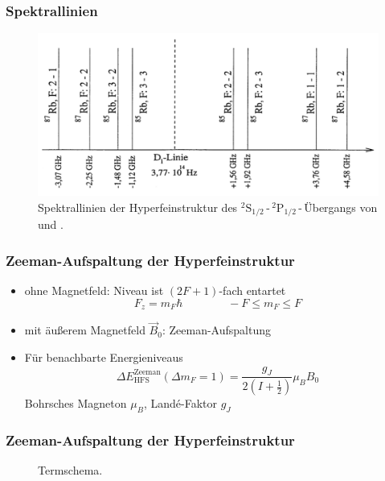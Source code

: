 \begin{frame}
\frametitle{Spektrallinien}
\begin{figure}
    \centering
    \includegraphics[width=\textwidth]{../img/HFSspect_theo.png}
    \caption{Spektrallinien der Hyperfeinstruktur des ${}^2\text{S}_{1/2}$\,-\,${}^2\text{P}_{1/2}$\,-\,Übergangs
    von  und .}  %
\end{figure}
\end{frame}

\begin{frame}
\frametitle{Zeeman-Aufspaltung der Hyperfeinstruktur}
\begin{itemize}
    \item<1-> ohne Magnetfeld: Niveau ist $(2F+1)$-fach entartet
    \begin{equation*}
        F_z = m_F \hbar \qquad \qquad -F \leq m_F \leq F
    \end{equation*}
    \item<2-> mit äußerem Magnetfeld $\vec{B}_0$: Zeeman-Aufspaltung
    \item<3-> Für benachbarte Energieniveaus
    \begin{equation*}
        \Delta E_\text{HFS}^\text{Zeeman}(\Delta m_F = 1) = \frac{g_J}{2 \left( I + \frac{1}{2} \right) } \mu_B B_0
    \end{equation*}
    Bohrsches Magneton $\mu_B$, Landé-Faktor $g_J$
\end{itemize}
\end{frame}

\begin{frame}
\frametitle{Zeeman-Aufspaltung der Hyperfeinstruktur}

\begin{figure}
    \centering
    \def\svgwidth{0.45\textwidth}
    
    \caption{Termschema.}
\end{figure}
\end{frame}





